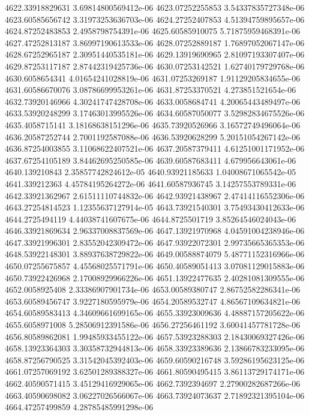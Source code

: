 {4622.33918829631 3.69814800569412e-06
4623.07252255853 3.54337835727348e-06
4623.60585656742 3.31973253636703e-06
4624.27252407853 4.51394759895657e-06
4624.87252483853 2.4958798754391e-06
4625.60585910075 5.71875959468391e-06
4627.47252813187 3.86997190613533e-06
4628.07252889187 1.76897052067147e-06
4628.67252965187 2.30951440535181e-06
4629.13919690965 2.81097193307407e-06
4629.87253117187 2.87442319425736e-06
4630.07253142521 1.62740179729768e-06
4630.6058654341 4.01654241028819e-06
4631.07253269187 1.91129205834655e-06
4631.60586670076 3.08786699953261e-06
4631.87253370521 4.273851521654e-06
4632.73920146966 4.30241747428708e-06
4633.0058684741 4.20065443489497e-06
4633.53920248299 3.17463013995526e-06
4634.60587050077 3.52982834675526e-06
4635.4058715141 3.18168638151296e-06
4635.73920526966 3.16572749496064e-06
4636.20587252744 2.7001192587088e-06
4636.53920628299 5.20151054267142e-06
4636.87254003855 3.11068622407521e-06
4637.20587379411 4.61251001171952e-06
4637.67254105189 3.84462695250585e-06
4639.60587683411 4.679956643061e-06
4640.139210843 2.35857742824612e-05
4640.93921185633 1.04008671065542e-05
4641.339212363 4.45784195264272e-06
4641.60587936745 3.14257553789331e-06
4642.33921362967 2.61511110744832e-06
4642.93921438967 2.47414116552306e-06
4643.27254814523 1.12355637127914e-05
4643.73921540301 3.75493430412633e-06
4644.2725494119 4.44038741607675e-06
4644.8725501719 3.85264546024043e-06
4646.33921869634 2.96337008837569e-06
4647.13921970968 4.04591004238946e-06
4647.33921996301 2.83552042309472e-06
4647.93922072301 2.99735665365353e-06
4648.53922148301 3.88937638729822e-06
4649.00588874079 5.48771152316966e-06
4650.07255675857 4.45568025571791e-06
4650.40589051413 3.07081129015883e-06
4650.73922426968 2.17008929966226e-06
4651.13922477635 2.40281081309555e-06
4652.0058925408 2.33386907901734e-06
4653.00589380747 2.86752582286341e-06
4653.60589456747 3.9227180595979e-06
4654.20589532747 4.86567109634821e-06
4654.60589583413 4.34609661699165e-06
4655.33923009636 4.48887157205622e-06
4655.6058971008 5.28506912391586e-06
4656.27256461192 3.60041457781728e-06
4656.80589862081 1.99485933455122e-06
4657.53923288303 2.18430069327426e-06
4658.13923364303 3.30358732944813e-06
4658.33923389636 2.13866783233095e-06
4658.87256790525 3.31542045392403e-06
4659.60590216748 3.59286195623125e-06
4661.07257069192 3.62501289388327e-06
4661.80590495415 3.86113729174171e-06
4662.40590571415 3.45129416929065e-06
4662.7392394697 2.27900282687266e-06
4663.40590698082 3.06227026566067e-06
4663.73924073637 2.71892321395104e-06
4664.47257499859 4.28785485991298e-06
}
